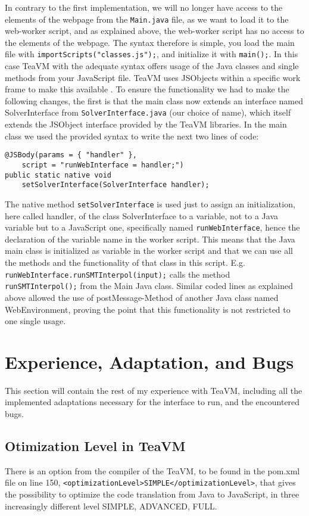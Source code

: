 \documentclass[12pt]{article}
\begin{document}
In contrary to the first implementation, we will no longer have access to the elements of the webpage from the \verb|Main.java| file, as we want to load it to the web-worker script, and as explained above, the web-worker script has no access to the elements of the webpage. The syntax therefore is simple, you load the main file with \texttt{importScripts("classes.js");}, and initialize it with \texttt{main();}. In this case TeaVM with the adequate syntax offers usage of the Java classes and single methods from your JavaScript file. TeaVM uses JSObjects within a specific work frame to make this available \cite{3}. To ensure the functionality we had to make the following changes, the first is that the main class now extends an interface named SolverInterface from \verb|SolverInterface.java| (our choice of name), which itself extends the JSObject interface provided by the TeaVM libraries. In the main class we used the provided syntax to write the next two lines of code:
\begin{verbatim}
@JSBody(params = { "handler" },
    script = "runWebInterface = handler;")
public static native void 
    setSolverInterface(SolverInterface handler);
\end{verbatim}
The native method \verb|setSolverInterface| is used just to assign an initialization, here called handler, of the class SolverInterface to a variable, not to a  Java variable but to a JavaScript one, specifically named \verb|runWebInterface|, hence the declaration of the variable name in the worker script. This means that the Java main class is initialized as variable in the worker script and that we can use all the methods and the functionality of that class in this script. E.g. \verb|runWebInterface.runSMTInterpol(input);| calls the method \verb|runSMTInterpol();| from the Main Java class.
Similar coded lines as explained above allowed the use of postMessage-Method of another Java class named WebEnvironment, proving the point that this functionality is not restricted to one single usage.

\section{Experience, Adaptation, and Bugs}
This section will contain the rest of my experience with TeaVM, including all the implemented adaptations necessary for the interface to run, and the encountered bugs.
\subsection{Otimization Level in TeaVM}
There is an option from the compiler of the TeaVM, to be found in the pom.xml file on line 150, \verb|<optimizationLevel>SIMPLE</optimizationLevel>|, that gives the possibility to optimize the code translation from Java to JavaScript, in three increasingly different level SIMPLE, ADVANCED, FULL.
\end{document}
